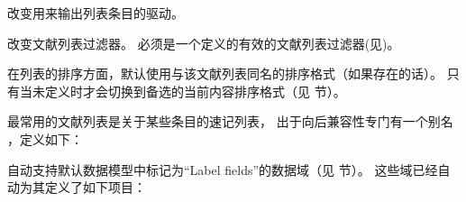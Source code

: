 \begin{ltxsyntax}
\begin{optionlist*}

改变用来输出列表条目的驱动。



改变文献列表过滤器。 必须是一个定义的有效的文献列表过滤器(见)。
\end{optionlist*}


在列表的排序方面，默认使用与该文献列表同名的排序格式（如果存在的话）。
只有当未定义时才会切换到备选的当前内容排序格式（见  节）。


最常用的文献列表是关于某些条目的速记列表，
出于向后兼容性专门有一个别名 ，定义如下：

\begin{ltxexample}
\end{ltxexample}



\biblatex 自动支持默认数据模型中标记为“Label fields”的数据域（见  节）。
这些域已经自动为其定义了如下项目：


\end{ltxsyntax}
